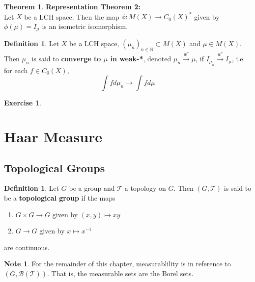 \documentclass[12pt]{amsart}
\theoremstyle{definition}
\newtheorem{defn}[definition]{Definition}
\newtheorem{note}[definition]{Note}
\newtheorem{thm}[definition]{Theorem}
\newtheorem{ex}[definition]{Exercise}
\newcommand{\N}{\mathbb{N}}
\newcommand{\MB}{\mathcal{B}}
\newcommand{\MT}{\mathcal{T}}
\newcommand{\conv}[1]{\xrightarrow{#1}}
\newcommand{\lex}[1]{\label{ex:#1}}
\newcommand{\ld}[1]{\label{defn:#1}}
\begin{document}
	\begin{thm}\textbf{Representation Theorem 2:}\\
	Let $X$ be a LCH space. Then the map $\phi: M(X) \rightarrow C_0(X)^*$ given by $\phi(\mu) = I_{\mu}$ is an isometric isomorphism. 
	\end{thm}
	
	
	
	
	\begin{defn} \ld{00000} 
	Let $X$ be a LCH space, $(\mu_n)_{n \in \N} \subset M(X)$ and $\mu \in M(X)$. Then $\mu_n$ is said to  \textbf{converge to $\mu$ in weak-*}, denoted $\mu_n \conv{w^*}\mu$, if $I_{\mu_n} \conv{w^*} I_{\mu}$, i.e. for each $f \in C_0(X)$, $$\int f d\mu_n \rightarrow \int f d\mu$$
	\end{defn}
	
	\begin{ex} \lex{00000} 
	
	\end{ex}
	
	
	
	
	
	
	
	
	
	

	
	
	
	
	
	
	
	
	
	
	
	
	
	\newpage
	\section{Haar Measure}
	
	\subsection{Topological Groups}
	\begin{defn} \ld{00000} 
		Let $G$ be a group and $\MT$ a topology on $G$. Then $(G, \MT)$ is said to be a \textbf{topological group} if the maps \begin{enumerate}
			\item $G \times G \rightarrow G$ given by $(x,y) \mapsto xy$
			\item  $G \rightarrow G$ given by $x \mapsto x^{-1}$ 
		\end{enumerate} are continuous.
	\end{defn}

	\begin{note}
		For the remainder of this chapter, measurablility is in reference to $(G, \MB(\MT))$. That is, the measurable sets are the Borel sets.
	\end{note}
	
\end{document}
